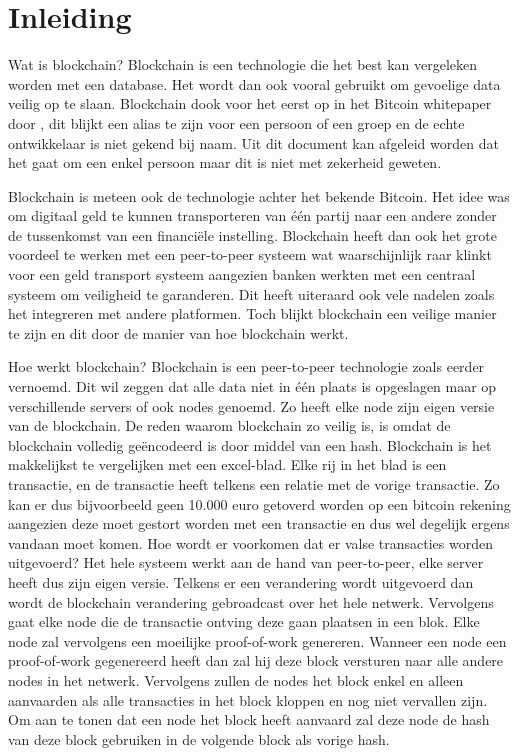 
\chapter{Inleiding}
\label{ch:inleiding}

Wat is blockchain? Blockchain is een technologie die het best kan vergeleken worden met een database. Het wordt dan ook vooral gebruikt om gevoelige data veilig op te slaan. Blockchain dook voor het eerst op in het Bitcoin whitepaper door \textcite{Nakamoto2008}, dit blijkt een alias te zijn voor een persoon of een groep en de echte ontwikkelaar is niet gekend bij naam. Uit dit document kan afgeleid worden dat het gaat om een enkel persoon maar dit is niet met zekerheid geweten.

Blockchain is meteen ook de technologie achter het bekende Bitcoin. Het idee was om digitaal geld te kunnen transporteren van één partij naar een andere zonder de tussenkomst van een financiële instelling. Blockchain heeft dan ook het grote voordeel te werken met een peer-to-peer systeem wat waarschijnlijk raar klinkt voor een geld transport systeem aangezien banken werkten met een centraal systeem om veiligheid te garanderen. Dit heeft uiteraard ook vele nadelen zoals het integreren met andere platformen. Toch blijkt blockchain een veilige manier te zijn en dit door de manier van hoe blockchain werkt.

Hoe werkt blockchain? Blockchain is een peer-to-peer technologie zoals eerder vernoemd. Dit wil zeggen dat alle data niet in één plaats is opgeslagen maar op verschillende servers of ook nodes genoemd. Zo heeft elke node zijn eigen versie van de blockchain. De reden waarom blockchain zo veilig is, is omdat de blockchain volledig geëncodeerd is door middel van een hash. Blockchain is het makkelijkst te vergelijken met een excel-blad. Elke rij in het blad is een transactie, en de transactie heeft telkens een relatie met de vorige transactie. Zo kan er dus bijvoorbeeld geen 10.000 euro getoverd worden op een bitcoin rekening aangezien deze moet gestort worden met een transactie en dus wel degelijk ergens vandaan moet komen. Hoe wordt er voorkomen dat er valse transacties worden uitgevoerd? Het hele systeem werkt aan de hand van peer-to-peer, elke server heeft dus zijn eigen versie. Telkens er een verandering wordt uitgevoerd dan wordt de blockchain verandering gebroadcast over het hele netwerk. Vervolgens gaat elke node die de transactie ontving deze gaan plaatsen in een blok. Elke node zal vervolgens een moeilijke proof-of-work genereren. Wanneer een node een proof-of-work gegenereerd heeft dan zal hij deze block versturen naar alle andere nodes in het netwerk. Vervolgens zullen de nodes het block enkel en alleen aanvaarden als alle transacties in het block kloppen en nog niet vervallen zijn. Om aan te tonen dat een node het block heeft aanvaard zal deze node de hash van deze block gebruiken in de volgende block als vorige hash. 


